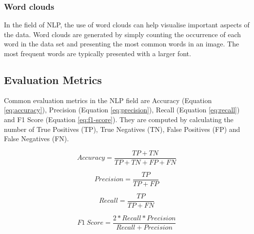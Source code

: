 \subsubsection{Word clouds}
In the field of NLP, the use of word clouds can help visualise important aspects of the data.
Word clouds are generated by simply counting the occurrence of each word in the data set and presenting the most common words in an image.
The most frequent words are typically presented with a larger font.

\subsection{Evaluation Metrics} \label{sec:evaluation-metrics}
Common evaluation metrics in the NLP field are Accuracy (Equation \ref{eq:accuracy}), Precision (Equation \ref{eq:precision}), Recall (Equation \ref{eq:recall}) and F1 Score (Equation \ref{eq:f1-score}).
They are computed by calculating the number of True Positives (TP), True Negatives (TN), False Positives (FP) and False Negatives (FN).

\begin{equation} \label{eq:accuracy}
    Accuracy = \frac{TP + TN}{TP + TN + FP + FN}
\end{equation}

\begin{equation} \label{eq:precision}
    Precision = \frac{TP}{TP + FP}
\end{equation}

\begin{equation} \label{eq:recall}
    Recall = \frac{TP}{TP + FN}
\end{equation}

\begin{equation} \label{eq:f1-score}
    F1\ Score = \frac{2 * Recall * Precision}{Recall + Precision}
\end{equation}

